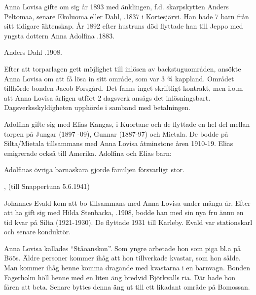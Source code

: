 Anna Lovisa gifte om sig år 1893 med änklingen, f.d. skarpskytten Anders Peltomaa, senare Ekoluoma eller Dahl, .1837 i Kortesjärvi. Han hade 7 barn från sitt tidigare äktenskap. År 1892 efter hustruns död flyttade han till Jeppo med yngsta dottern Anna Adolfina .1883.

Anders Dahl .1908.

Efter att torparlagen gett möjlighet till inlösen av backstuguområden, ansökte Anna Lovisa om att få lösa in sitt område, som var 3 ¾ kappland. Området tillhörde bonden Jacob Forsgård. Det fanns inget skriftligt kontrakt, men i.o.m att Anna Lovisa årligen utfört 2 dagsverk ansågs det inlösningsbart. Dagsverksskyldigheten upphörde i samband med betalningen.

Adolfina gifte sig med Elias Kangas,  i Kuortane och de flyttade en hel del mellan torpen på Jungar (1897 -09), Gunnar (1887-97) och Mietala. De bodde på Silta/Mietala tillsammans med Anna Lovisa åtminstone åren 1910-19. Elias emigrerade också till Amerika. Adolfina och Elias barn:
\begin{jhchildren}
  \item {}
  \item {}
\end{jhchildren}
Adolfinas övriga barnaskara gjorde familjen försvarligt stor.
\begin{jhchildren}
  \item {}
  \item {}
  \item {}
  \item {}
  \item {}, (till Snappertuna 5.6.1941)
  \item {}
\end{jhchildren}
Johannes Evald kom att bo tillsammans med Anna Lovisa under många år. Efter att ha gift sig med Hilda Stenbacka,  .1908, bodde han med sin nya fru ännu en tid kvar på Silta (1921-1930). De flyttade 1931 till Karleby. Evald var stationskarl och senare konduktör.

Anna Lovisa kallades ``Ståoanskon''. Som yngre arbetade hon som piga bl.a på Böös. Äldre personer kommer ihåg att hon tillverkade kvastar, som hon sålde. Man kommer ihåg henne komma dragande med kvastarna i en barnvagn. Bonden Fagerholm höll henne med en liten äng bredvid Björkvalls ria. Där hade hon fåren att beta.  Senare byttes denna äng ut till ett likadant område på Bomossan.

